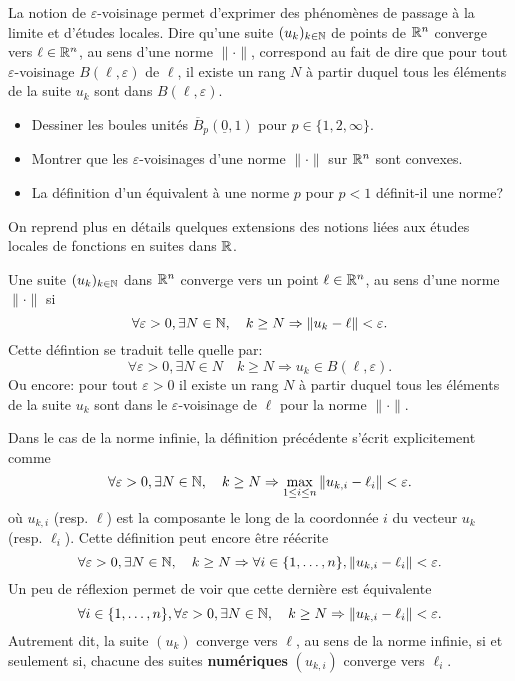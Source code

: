 \documentclass[11pt, a4paper]{article}
\begin{document}
La notion de $\varepsilon$-voisinage permet d'exprimer des
phénomènes de passage à la limite et d'études locales. Dire qu'une
suite $(u_k)_{k \in \mathbb{N}}$ de points de $\mathbb{R}^n$ converge vers
$\ell \in \mathbb{R}^n$, au sens d'une norme $\|\cdot\|$, correspond au fait
de dire que pour tout $\varepsilon$-voisinage $B(\ell, \varepsilon)$
de $\ell$, il existe un rang $N$ à partir duquel tous les éléments
de la suite $u_k$ sont dans $B(\ell, \varepsilon)$.
\begin{question}
  \begin{itemize}
  \item Dessiner les boules unités
    $\overline{B}_p(\underline{0}, 1)$ pour
    $p \in \{1, 2, \infty\}$.
  \item Montrer que les $\varepsilon$-voisinages d'une norme
    $\|\cdot\|$ sur $\mathbb{R}^n$ sont convexes.
  \item La définition d'un équivalent à une norme $p$ pour $p < 1$
    définit-il une norme?
  \end{itemize}
\end{question}
On reprend plus en détails quelques extensions des notions liées aux
études locales de fonctions en suites dans $\mathbb{R}$.
\begin{exmp}
  Une suite $(u_k)_{k\in \mathbb{N}}$ dans $\mathbb{R}^n$ converge vers un point
  $\ell \in \mathbb{R}^n$, au sens d'une norme $\|\cdot\|$ si
  \[
    \forall \varepsilon > 0, \exists N \in \mathbb{N}, \quad k \geq N
    \Rightarrow \|u_k - \ell \| < \varepsilon.
  \]
  Cette défintion se traduit telle quelle par:
  \[
    \forall \varepsilon > 0, \exists N \in N \quad k \geq N
    \Rightarrow u_k \in B(\ell, \varepsilon).
  \]
  Ou encore: pour tout $\varepsilon > 0$ il existe un rang $N$ à
  partir duquel tous les éléments de la suite $u_k$ sont dans le
  $\varepsilon$-voisinage de $\ell$ pour la norme $\|\cdot\|$.

  Dans le cas de la norme infinie, la définition précédente s'écrit
  explicitement comme
  \[
    \forall \varepsilon > 0, \exists N \in \mathbb{N}, \quad k \geq N
    \Rightarrow \max_{1 \leq i \leq n}\|u_{k, i} - \ell_i \| < \varepsilon.
  \]
  où $u_{k, i}$ (resp. $\ell$) est la composante le long de la
  coordonnée $i$ du vecteur $u_k$ (resp. $\ell_i$). Cette définition
  peut encore être réécrite
  \[
    \forall \varepsilon > 0, \exists N \in \mathbb{N}, \quad k \geq N
    \Rightarrow \forall i \in \{1, \ldots, n\}, \|u_{k, i} - \ell_i \| <
    \varepsilon.
  \]
  Un peu de réflexion permet de voir que cette dernière est
  équivalente
    \[
      \forall i \in \{1, \ldots, n\}, \forall \varepsilon > 0, \exists
      N \in \mathbb{N}, \quad k \geq N \Rightarrow \|u_{k, i} - \ell_i \| <
      \varepsilon.
  \]
  Autrement dit, la suite $(u_k)$ converge vers $\ell$, au sens de la
  norme infinie, si et seulement si, chacune des suites
  \textbf{numériques} $(u_{k, i})$ converge vers $\ell_i$.
\end{exmp}
\end{document}
